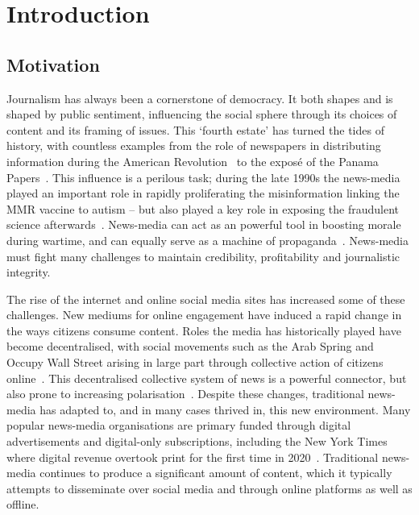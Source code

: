 \chapter{Introduction}\label{ch:introduction}

\section{Motivation}




Journalism has always been a cornerstone of democracy. It both shapes and is shaped by public sentiment, influencing the social sphere through its choices of content and its framing of issues. This `fourth estate' has turned the tides of history, with countless examples from the role of newspapers in distributing information during the American Revolution~\cite{tranFourthEstateFinal2016} to the exposé of the Panama Papers~\cite{odonovanValueOffshoreSecrets2019}. This influence is a perilous task; during the late 1990s the news-media played an important role in rapidly proliferating the misinformation linking the MMR vaccine to autism -- but also played a key role in exposing the fraudulent science afterwards~\cite{godleeWakefieldArticleLinking2011}. News-media can act as an powerful tool in boosting morale during wartime, and can equally serve as a machine of propaganda~\cite{jones2001censorship}. News-media must fight many challenges to maintain credibility, profitability and journalistic integrity. 


The rise of the internet and online social media sites has increased some of these challenges. New mediums for online engagement have induced a rapid change in the ways citizens consume content. Roles the media has historically played have become decentralised, with social movements such as the Arab Spring and Occupy Wall Street arising in large part through collective action of citizens online~\cite{skinnerSocialMediaRevolution2011}. This decentralised collective system of news is a powerful connector, but also prone to increasing polarisation~\cite{barberaTweetingLeftRight2015}. %
Despite these changes, traditional news-media has adapted to, and in many cases thrived in, this new environment. Many popular news-media organisations are primary funded through digital advertisements and digital-only subscriptions, including the New York Times where digital revenue overtook print for the first time in 2020~\cite{tracyNewYorkTimes2021}. Traditional news-media continues to produce a significant amount of content, which it typically attempts to disseminate over social media and through online platforms as well as offline.


